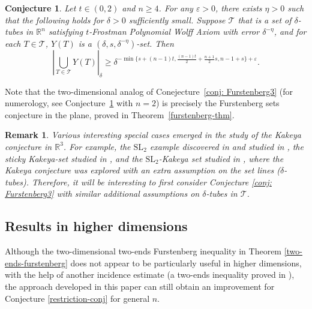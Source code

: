 \documentclass{amsart}
\numberwithin{equation}{section}
\newtheorem{remark}[theorem]{Remark}
\newtheorem{conjecture}[theorem]{Conjecture}
\newcommand{\de}{\delta}
\newcommand{\e}{\varepsilon}
\newcommand{\ZR}{\mathbb{R}}
\newcommand{\cT}{{\mathcal T}}
\begin{document}
\begin{conjecture} \label{conj: Furstenbergn}
Let $t\in (0,2)$ and $n\geq 4$. 
For any $\e>0$, there exists $\eta>0$ such that the following holds for $\delta>0$ sufficiently small. 
Suppose $\cT$ that is a set of $\delta$-tubes in $\mathbb{R}^n$ satisfying  $t$-Frostman Polynomial Wolff Axiom with error $\delta^{-\eta}$, and for each $T\in \cT$, $Y(T)$ is a $(\delta, s, \delta^{-\eta})$-set.  Then 
    \begin{equation}\label{eq: furstenbergn}
    |\bigcup_{T\in \cT} Y(T)|_{\delta} \geq \delta^{-\min \{ s+ (n-1) t, \frac{(n-1)t}{2}+\frac{n+1}{2}s, n-1+s\}+\e}.
    \end{equation}
\end{conjecture}

Note that the two-dimensional analog of Conejecture~\ref{conj: Furstenberg3} (for numerology, see Conjecture~\ref{conj: Furstenbergn} with $n=2$)  is precisely the Furstenberg sets conjecture in the plane, proved in Theorem~\ref{furstenberg-thm}.  


\begin{remark}
\rm

Various interesting special cases emerged in the study of the Kakeya conjecture in $\ZR^3$. 
For example, the $\text{SL}_2$ example discovered in \cite{Katz-Zahl-1} and studied in \cite{Wu-regulus-strip}, the sticky Kakeya-set studied in \cite{WZ22}, and the $\text{SL}_2$-Kakeya set studied in \cite{FO-23, KWZ}, where the Kakeya conjecture was explored with an extra assumption on the set lines ($\de$-tubes).
Therefore, it will be interesting to first consider Conjecture \ref{conj: Furstenberg3} with similar additional assumptions on $\de$-tubes in $\cT$.


\end{remark}

\medskip

\subsection{Results in higher dimensions}
\label{higher-dimension-intro}

Although the two-dimensional two-ends Furstenberg inequality in Theorem \ref{two-ends-furstenberg} does not appear to be particularly useful in higher dimensions, with the help of another incidence estimate (a two-ends inequality proved in \cite{Katz-Tao-Kakeya-maximal}), the approach developed in this paper can still obtain an improvement for Conjecture \ref{restriction-conj} for general $n$.
\end{document}
